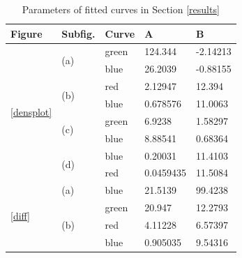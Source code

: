 \documentclass[a4paper,12pt,twoside]{report}
\begin{document}
\begin{table}[tp]
\centering
\begin{tabular}{|l|l|l|l|l|}
\hline
Figure & Subfig. & Curve & A & B \\ \hline
\multirow{8}{*}{\ref{densplot}} & \multirow{2}{*}{(a)} & green & 124.344 & -2.14213 \\
 							& 					   & blue & 26.2039 & -0.88155 \\ \cline{2-5}	
 							& \multirow{2}{*}{(b)} & red & 2.12947 & 12.394 \\ 
 							& 				       & blue & 0.678576 & 11.0063 \\ \cline{2-5}
							& \multirow{2}{*}{(c)} & green & 6.9238 & 1.58297 \\
 							& 					   & blue & 8.88541 & 0.68364 \\ \cline{2-5}	
 							& \multirow{2}{*}{(d)} & blue & 0.20031 & 11.4103 \\ 
 							&    				   & red & 0.0459435 & 11.5084 \\ \hline
\multirow{4}{*}{\ref{diff}} & (a)				   & blue & 21.5139 & 99.4238 \\ \cline{2-5}	
 							& \multirow{3}{*}{(b)} & green & 20.947 & 12.2793 \\
 							& 					   & red & 4.11228 & 6.57397 \\ 
 							& 					   & blue & 0.905035 & 9.54316 \\ \hline
\end{tabular}
\caption{Parameters of fitted curves in Section \ref{results}}
\end{table}





\clearpage

\listoffigures
\clearpage

\listoftables
\clearpage



\end{document}

